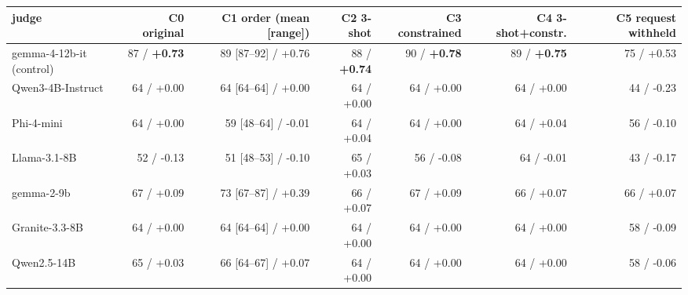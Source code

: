 \setlength{\tabcolsep}{2.5pt}
\begin{tabular}{@{}l r r r r r r @{}}
\toprule
judge & C0 original & C1 order (mean [range]) & C2 3-shot & C3 constrained & C4 3-shot+constr. & C5 request withheld \\
\midrule
gemma-4-12b-it (control) & 87 / \textbf{+0.73} & 89 [87--92] / +0.76 & 88 / \textbf{+0.74} & 90 / \textbf{+0.78} & 89 / \textbf{+0.75} & 75 / +0.53 \\
Qwen3-4B-Instruct & 64 / +0.00 & 64 [64--64] / +0.00 & 64 / +0.00 & 64 / +0.00 & 64 / +0.00 & 44 / -0.23 \\
Phi-4-mini & 64 / +0.00 & 59 [48--64] / -0.01 & 64 / +0.04 & 64 / +0.00 & 64 / +0.04 & 56 / -0.10 \\
Llama-3.1-8B & 52 / -0.13 & 51 [48--53] / -0.10 & 65 / +0.03 & 56 / -0.08 & 64 / -0.01 & 43 / -0.17 \\
gemma-2-9b & 67 / +0.09 & 73 [67--87] / +0.39 & 66 / +0.07 & 67 / +0.09 & 66 / +0.07 & 66 / +0.07 \\
Granite-3.3-8B & 64 / +0.00 & 64 [64--64] / +0.00 & 64 / +0.00 & 64 / +0.00 & 64 / +0.00 & 58 / -0.09 \\
Qwen2.5-14B & 65 / +0.03 & 66 [64--67] / +0.07 & 64 / +0.00 & 64 / +0.00 & 64 / +0.00 & 58 / -0.06 \\
\bottomrule
\end{tabular}
